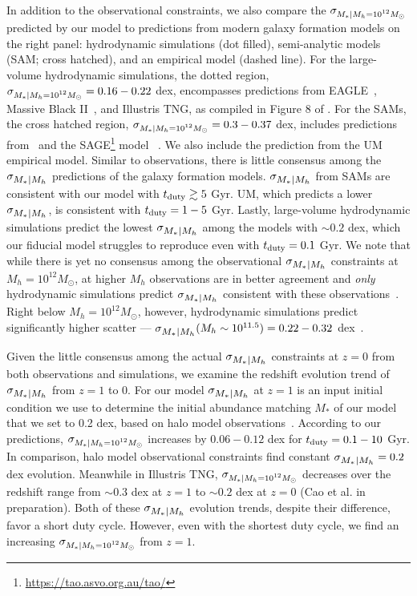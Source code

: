 \documentclass[12pt, letterpaper, preprint, tighten]{aastex62}
\newcommand{\edt}[1]{{\color{dred}{\bf} #1}}
\newcommand{\siglogm}{\sigma_{\scaleto{M_*|M_h}{8pt}}}
\newcommand{\sigtwe}{\sigma_{\scaleto{M_*|M_h=10^{12}M_\odot}{8pt}}}
\begin{document}
In addition to the observational constraints, we also compare the $\sigtwe$
predicted by our model to predictions from modern galaxy formation models
on the right panel: hydrodynamic simulations (dot filled), semi-analytic models
(SAM; cross hatched), and an empirical model (dashed line). For the large-volume hydrodynamic 
simulations, the dotted region, $\sigtwe = 0.16 - 0.22$ dex, encompasses
predictions from EAGLE~\citep{matthee2017}, Massive Black II~\citep{khandai2015},
and Illustris TNG, as compiled in Figure 8 of \cite{wechsler2018}.
For the SAMs, the cross hatched region, $\sigtwe = 0.3 - 0.37$ dex, includes predictions 
from~\cite{lu2014, somerville2012} and the SAGE\footnote{\url{https://tao.asvo.org.au/tao/}}
model~\edt{\citep{croton2016}}. We also include the prediction from the
\cite{behroozi2019} UM empirical model. Similar to observations, there is 
little consensus among the $\siglogm$ predictions of the galaxy formation models.
$\siglogm$ from SAMs are consistent with our model with $t_{\rm duty} \gtrsim 5$ Gyr. 
UM, which predicts a lower $\siglogm$, is consistent with $t_{\rm duty} = 1 - 5$ Gyr.
Lastly, large-volume hydrodynamic simulations predict the lowest $\siglogm$ among the models
with $\sim 0.2$ dex, which our fiducial model struggles to reproduce even with 
$t_{\rm duty} = 0.1$ Gyr. We note that while there is yet no consensus among the 
observational $\siglogm$ constraints at $M_h=10^{12} M_\odot$, at higher $M_h$ 
observations are in better agreement and {\em only} hydrodynamic simulations 
predict $\siglogm$ consistent with these observations~\citep{wechsler2018}. Right 
below $M_h=10^{12}M_\odot$, however, hydrodynamic simulations predict significantly 
higher scatter --- $\siglogm(M_h\sim 10^{11.5}) = 0.22 - 0.32$ dex~\citep{wechsler2018}.

Given the little consensus among the actual $\siglogm$ constraints at $z=0$ 
from both observations and simulations, we examine the redshift evolution trend 
of $\siglogm$ from $z=1$ to 0. For our model $\siglogm$ at $z=1$ 
is an input initial condition we
use to determine the initial abundance matching $M_*$ of our model that we set to 0.2 dex, based 
on halo model observations~\citep[\emph{e.g.}][]{leauthaud2012, tinker2013, patel2015}. 
According to our predictions, $\sigtwe$ increases by $0.06 - 0.12$ dex for 
$t_{\rm duty} = 0.1-10$ Gyr. In comparison, halo model observational constraints find 
constant $\siglogm=0.2$ dex evolution. Meanwhile in Illustris TNG, $\sigtwe$ 
decreases over the redshift range from $\sim 0.3$ dex at $z=1$ to $\sim 0.2$ dex 
at $z=0$ (Cao et al. in preparation). Both of these $\siglogm$ evolution 
trends, despite their difference, favor a short duty cycle. However, even with the 
shortest duty cycle, we find an increasing $\sigtwe$ from $z=1$. 
 
\end{document}
